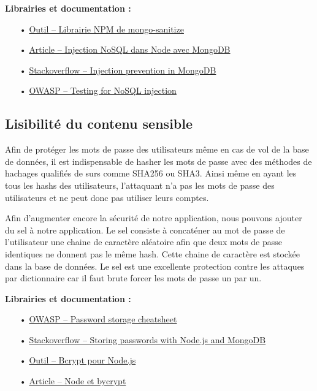 \medskip
\textbf{Librairies et documentation :}

\begin{itemize}
\item[•] \href{https://www.npmjs.com/package/mongo-sanitize}{Outil -- Librairie NPM de mongo-sanitize}
\item[•] \href{https://zanon.io/posts/nosql-injection-in-mongodb}{Article -- Injection NoSQL dans Node avec MongoDB}
\item[•] \href{https://stackoverflow.com/questions/13436467/javascript-nosql-injection-prevention-in-mongodb}{Stackoverflow -- Injection prevention in MongoDB}
\item[•] \href{https://www.owasp.org/index.php/Testing_for_NoSQL_injection}{OWASP -- Testing for NoSQL injection}
\end{itemize}

\subsection{Lisibilité du contenu sensible}
\label{ssec:cm-hash}

Afin de protéger les mots de passe des utilisateurs même en cas de vol de la base de données, il est indispensable de hasher les mots de passe avec des méthodes de hachages qualifiés de surs comme SHA256 ou SHA3. Ainsi même en ayant les tous les hashs des utilisateurs, l'attaquant n'a pas les mots de passe des utilisateurs et ne peut donc pas utiliser leurs comptes. 

Afin d'augmenter encore la sécurité de notre application, nous pouvons ajouter du sel à notre application. Le sel consiste à concaténer au mot de passe de l'utilisateur une chaine de caractère aléatoire afin que deux mots de passe identiques ne donnent pas le même hash. Cette chaine de caractère est stockée dans la base de données. Le sel est une excellente protection contre les attaques par dictionnaire car il faut brute forcer les mots de passe un par un.
\clearpage

\medskip
\textbf{Librairies et documentation :}

\begin{itemize}
\item[•] \href{https://www.owasp.org/index.php/Password_Storage_Cheat_Sheet}{OWASP -- Password storage cheatsheet}
\item[•] \href{https://stackoverflow.com/questions/6951563/storing-passwords-with-node-js-and-mongodb}{Stackoverflow -- Storing passwords with Node.js and MongoDB}
\item[•] \href{https://github.com/kelektiv/node.bcrypt.js}{Outil -- Bcrypt pour Node.js}
\item[•] \href{https://www.abeautifulsite.net/hashing-passwords-with-nodejs-and-bcrypt}{Article -- Node et bycrypt}
\end{itemize}
 
